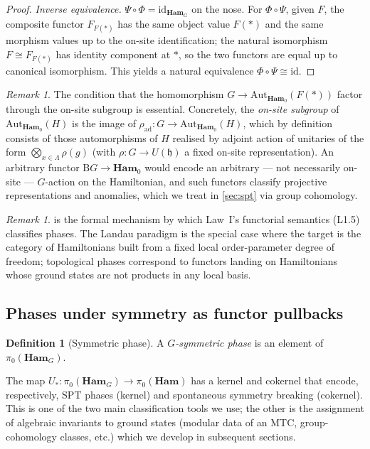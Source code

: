 \documentclass[12pt]{article}
\theoremstyle{plain}
\theoremstyle{definition}
\newtheorem{definition}[theorem]{Definition}
\theoremstyle{remark}
\newtheorem{remark}[theorem]{Remark}
\newcommand{\Ham}{\mathbf{Ham}}
\newcommand{\BG}{\mathrm{B}G}
\newcommand{\id}{\mathrm{id}}
\begin{document}
\begin{proof}
\emph{Inverse equivalence.}
$\Psi\circ\Phi=\id_{\Ham_{G}}$ on the nose. For $\Phi\circ\Psi$, given $F$, the
composite functor $F_{F(\ast)}$ has the same object value $F(\ast)$ and the same
morphism values up to the on-site identification; the natural isomorphism
$F\cong F_{F(\ast)}$ has identity component at $\ast$, so the two functors are equal up
to canonical isomorphism. This yields a natural equivalence $\Phi\circ\Psi\cong\id$.
\end{proof}

\begin{remark}
The condition that the homomorphism $G\to\mathrm{Aut}_{\Ham_{0}}(F(\ast))$ factor
through the on-site subgroup is essential. Concretely, the \emph{on-site subgroup} of
$\mathrm{Aut}_{\Ham_{0}}(H)$ is the image of $\rho_{\mathrm{ad}}:G\to
\mathrm{Aut}_{\Ham_{0}}(H)$, which by definition consists of those automorphisms of $H$
realised by adjoint action of unitaries of the form $\bigotimes_{x\in\Lambda}\rho(g)$
(with $\rho:G\to U(\mathfrak{h})$ a fixed on-site representation). An arbitrary functor
$\BG\to\Ham_{0}$ would encode an arbitrary --- not necessarily on-site --- $G$-action
on the Hamiltonian, and such functors classify projective representations and
anomalies, which we treat in \cref{sec:spt} via group cohomology.
\end{remark}

\begin{remark}
 is the formal mechanism by which Law~I's functorial
semantics (L1.5) classifies phases. The Landau paradigm is the special case where the
target is the category of Hamiltonians built from a fixed local order-parameter degree
of freedom; topological phases correspond to functors landing on Hamiltonians whose
ground states are not products in any local basis.
\end{remark}

\subsection{Phases under symmetry as functor pullbacks}

\begin{definition}[Symmetric phase]
\label{def:sym-phase}
A \emph{$G$-symmetric phase} is an element of $\pi_{0}(\Ham_{G})$.
\end{definition}

The map $U_{*}:\pi_{0}(\Ham_{G})\to\pi_{0}(\Ham)$ has a kernel and cokernel that
encode, respectively, SPT phases (kernel) and spontaneous symmetry breaking (cokernel).
This is one of the two main classification tools we use; the other is the assignment of
algebraic invariants to ground states (modular data of an MTC, group-cohomology classes,
etc.) which we develop in subsequent sections.
\end{document}

